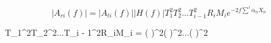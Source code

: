 $$|{A_{ri}}(f)| = |{A_{ti}}(f)||H(f)|T_1^2T_2^2...T_{i - 1}^2{R_i}{M_i}{e^{ - 2f\sum\limits_{}^i {{\alpha _n}{X_n}} }} $$



$$T_1^2T_2^2...T_{i - 1}^2{R_i}{M_i} = {\left( {} \right)^2}{\left( {} \right)^2}...{\left( {} \right)^2}


